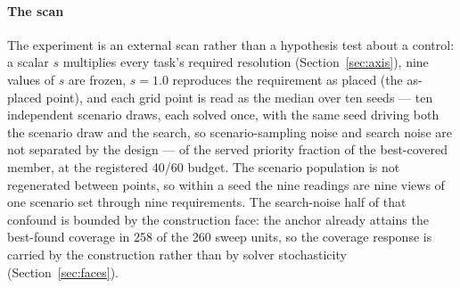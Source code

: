 \documentclass[preprint,authoryear]{elsarticle}
\begin{document}
\paragraph{The scan} The experiment is an external scan rather than a hypothesis test about a control: a scalar $s$ multiplies every task's required resolution (Section~\ref{sec:axis}), nine values of $s$ are frozen, $s=1.0$ reproduces the requirement as placed (the as-placed point), and each grid point is read as the median over ten seeds --- ten independent scenario draws, each solved once, with the same seed driving both the scenario draw and the search, so scenario-sampling noise and search noise are not separated by the design --- of the served priority fraction of the best-covered member, at the registered 40/60 budget. The scenario population is not regenerated between points, so within a seed the nine readings are nine views of one scenario set through nine requirements. The search-noise half of that confound is bounded by the construction face: the anchor already attains the best-found coverage in 258 of the 260 sweep units, so the coverage response is carried by the construction rather than by solver stochasticity (Section~\ref{sec:faces}).
\end{document}
